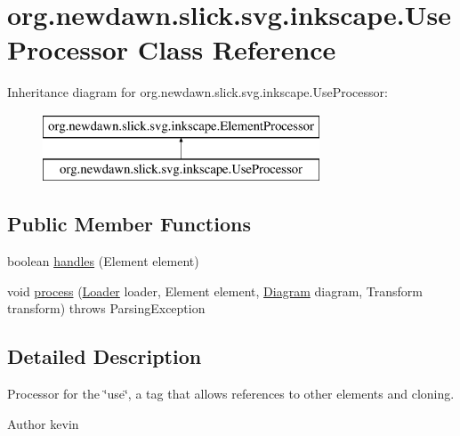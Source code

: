 \hypertarget{classorg_1_1newdawn_1_1slick_1_1svg_1_1inkscape_1_1_use_processor}{}\section{org.\+newdawn.\+slick.\+svg.\+inkscape.\+Use\+Processor Class Reference}
\label{classorg_1_1newdawn_1_1slick_1_1svg_1_1inkscape_1_1_use_processor}
Inheritance diagram for org.\+newdawn.\+slick.\+svg.\+inkscape.\+Use\+Processor\+:\begin{figure}[H]
\begin{center}
\leavevmode
\includegraphics[height=2.000000cm]{classorg_1_1newdawn_1_1slick_1_1svg_1_1inkscape_1_1_use_processor}
\end{center}
\end{figure}
\subsection*{Public Member Functions}
\begin{DoxyCompactItemize}
\item 
boolean \mbox{\hyperlink{classorg_1_1newdawn_1_1slick_1_1svg_1_1inkscape_1_1_use_processor_a708b3d8ee6187b45b27913116c689e43}{handles}} (Element element)
\item 
void \mbox{\hyperlink{classorg_1_1newdawn_1_1slick_1_1svg_1_1inkscape_1_1_use_processor_ad331d42472c6acee3c1c5ee1ddce27e9}{process}} (\mbox{\hyperlink{interfaceorg_1_1newdawn_1_1slick_1_1svg_1_1_loader}{Loader}} loader, Element element, \mbox{\hyperlink{classorg_1_1newdawn_1_1slick_1_1svg_1_1_diagram}{Diagram}} diagram, Transform transform)  throws Parsing\+Exception 
\end{DoxyCompactItemize}


\subsection{Detailed Description}
Processor for the \char`\"{}use\char`\"{}, a tag that allows references to other elements and cloning.

\begin{DoxyAuthor}{Author}
kevin 
\end{DoxyAuthor}


